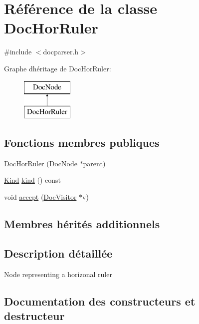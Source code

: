 \hypertarget{class_doc_hor_ruler}{}\section{Référence de la classe Doc\+Hor\+Ruler}
\label{class_doc_hor_ruler}


{\ttfamily \#include $<$docparser.\+h$>$}

Graphe d\textquotesingle{}héritage de Doc\+Hor\+Ruler\+:\begin{figure}[H]
\begin{center}
\leavevmode
\includegraphics[height=2.000000cm]{class_doc_hor_ruler}
\end{center}
\end{figure}
\subsection*{Fonctions membres publiques}
\begin{DoxyCompactItemize}
\item 
\hyperlink{class_doc_hor_ruler_a441230a651166279882a4bee81f4eab4}{Doc\+Hor\+Ruler} (\hyperlink{class_doc_node}{Doc\+Node} $\ast$\hyperlink{class_doc_node_a990d8b983962776a647e6231d38bd329}{parent})
\item 
\hyperlink{class_doc_node_aebd16e89ca590d84cbd40543ea5faadb}{Kind} \hyperlink{class_doc_hor_ruler_acdf68a250c2d1ef116e41e24d68b748d}{kind} () const 
\item 
void \hyperlink{class_doc_hor_ruler_abd8d0ca3ec21f2ad20719c3840724118}{accept} (\hyperlink{class_doc_visitor}{Doc\+Visitor} $\ast$v)
\end{DoxyCompactItemize}
\subsection*{Membres hérités additionnels}


\subsection{Description détaillée}
Node representing a horizonal ruler 

\subsection{Documentation des constructeurs et destructeur}
\hypertarget{class_doc_hor_ruler_a441230a651166279882a4bee81f4eab4}{}
